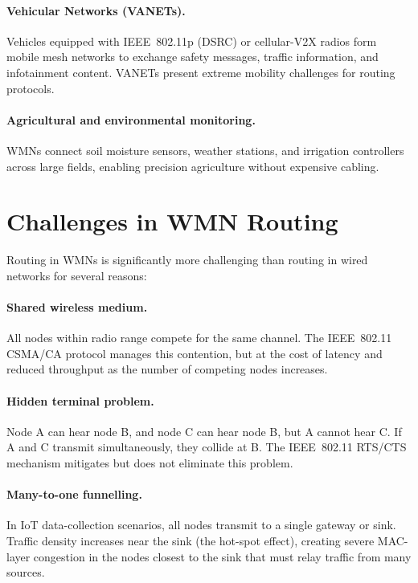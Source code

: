 \paragraph{Vehicular Networks (VANETs).}
Vehicles equipped with IEEE~802.11p (DSRC) or cellular-V2X radios form mobile mesh
networks to exchange safety messages, traffic information, and infotainment content.
VANETs present extreme mobility challenges for routing protocols.

\paragraph{Agricultural and environmental monitoring.}
WMNs connect soil moisture sensors, weather stations, and irrigation controllers across
large fields, enabling precision agriculture without expensive cabling.

\section{Challenges in WMN Routing}

Routing in WMNs is significantly more challenging than routing in wired networks for
several reasons:

\paragraph{Shared wireless medium.}
All nodes within radio range compete for the same channel. The IEEE~802.11 CSMA/CA
protocol manages this contention, but at the cost of latency and reduced throughput as
the number of competing nodes increases.

\paragraph{Hidden terminal problem.}
Node A can hear node B, and node C can hear node B, but A cannot hear C. If A and C
transmit simultaneously, they collide at B. The IEEE~802.11 RTS/CTS mechanism
mitigates but does not eliminate this problem.

\paragraph{Many-to-one funnelling.}
In IoT data-collection scenarios, all nodes transmit to a single gateway or sink. Traffic
density increases near the sink (the hot-spot effect), creating severe MAC-layer
congestion in the nodes closest to the sink that must relay traffic from many sources.

